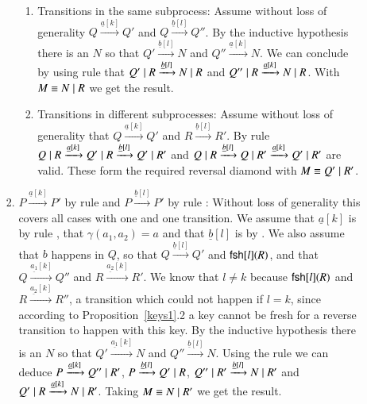 \begin{pf}
\begin{enumerate}
\begin{enumerate}
\begin{enumerate}
\begin{enumerate}
\item Transitions in the same subprocess: Assume without loss of generality $Q \xrightarrow{\underline{a}[k]} Q'$ and $Q \xrightarrow{\underline{b}[l]} Q''$. By the inductive hypothesis there is an $N$ so that $Q' \xrightarrow{\underline{b}[l]} N$ and $Q'' \xrightarrow{\underline{a}[k]} N$. We can conclude by using rule  that $Q' \; \vert \; R \xrightarrow{\underline{b}[l]} N \; \vert \; R$ and $Q'' \; \vert \; R \xrightarrow{\underline{a}[k]} N \; \vert \; R$. With $M \equiv N \; \vert \; R$ we get the result.
\item Transitions in different subprocesses: Assume without loss of generality that $Q \xrightarrow{\underline{a}[k]} Q'$ and $R \xrightarrow{\underline{b}[l]} R'$. By rule  $Q \; \vert \; R \xrightarrow{\underline{a}[k]} Q' \; \vert \; R \xrightarrow{\underline{b}[l]} Q' \; \vert \; R'$ and $Q \; \vert \; R \xrightarrow{\underline{b}[l]} Q \; \vert \; R' \xrightarrow{\underline{a}[k]} Q' \; \vert \; R'$ are valid. These form the required reversal diamond with $M \equiv Q' \; \vert \; R'$.
\end{enumerate}

\item $P \xrightarrow{\underline{a}[k]} P'$ by rule  and $P \xrightarrow{\underline{b}[l]} P'$ by rule : Without loss of generality this covers all cases with one  and one  transition. We assume that $\underline{a}[k]$ is by rule , that $\gamma(a_1,a_2)=a$ and that $\underline{b}[l]$ is by . We also assume that $b$ happens in $Q$, so that $Q \xrightarrow{\underline{b}[l]} Q'$ and $\mathsf{fsh}[l](R)$, and that $Q \xrightarrow{\underline{a_1}[k]} Q''$ and $R \xrightarrow{\underline{a_2}[k]} R'$. We know that $l \neq k$ because $\mathsf{fsh}[l](R)$ and $R \xrightarrow{\underline{a_2}[k]} R''$, a transition which could not happen if $l=k$, since according to Proposition~\ref{keys1}.2 
a key cannot be fresh for a reverse transition to happen with this key. By the inductive hypothesis there is an $N$ so that $Q' \xrightarrow{\underline{a_1}[k]} N$ and $Q'' \xrightarrow{\underline{b}[l]} N$. 
Using the  rule we can deduce $P \xrightarrow{\underline{a}[k]} Q'' \; \vert \; R'$,  $P\xrightarrow{\underline{b}[l]} Q' \; \vert \; R$, $Q'' \; \vert \; R' \xrightarrow{\underline{b}[l]} N \; \vert \; R'$ and $Q' \; \vert \; R \xrightarrow{\underline{a}[k]} N \; \vert \; R'$. Taking $M \equiv N \; \vert \; R'$ we get the result.


\end{enumerate}
\end{enumerate}
\end{enumerate}
\end{pf}
